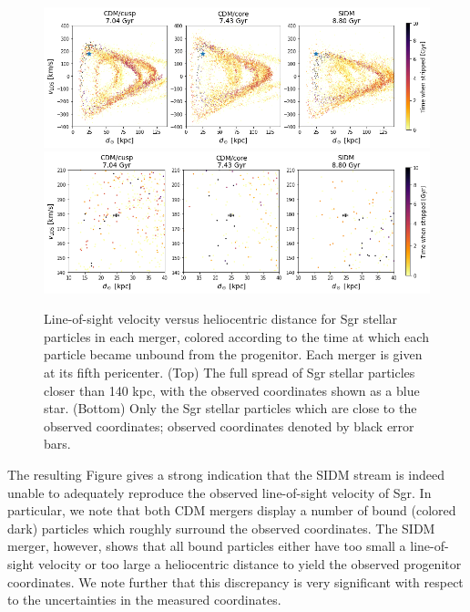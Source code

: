 \begin{figure}
    \centering
    \includegraphics[width=1.0\linewidth]{figs/vel_v_dist_peri_only.png}
    \includegraphics[width=1.0\linewidth]{figs/vel_v_dist_zoomed.png}
    \caption{%
        Line-of-sight velocity versus heliocentric distance for Sgr stellar
        particles in each merger, colored according to the time at which each
        particle became unbound from the progenitor. Each merger is given at its
        fifth pericenter. (Top) The full spread of Sgr stellar particles closer
        than 140 kpc, with the observed coordinates shown as a blue star.
        (Bottom) Only the Sgr stellar particles which are close to the observed
        coordinates; observed coordinates denoted by black error bars.
    }
    \label{fig:vel_v_dist}
\end{figure}

The resulting Figure gives a strong indication that the SIDM stream is indeed
unable to adequately reproduce the observed line-of-sight velocity of Sgr. In
particular, we note that both CDM mergers display a number of bound (colored
dark) particles which roughly surround the observed coordinates.  The SIDM
merger, however, shows that all bound particles either have too small a
line-of-sight velocity or too large a heliocentric distance to yield the
observed progenitor coordinates. We note further that this discrepancy is very
significant with respect to the uncertainties in the measured coordinates.


